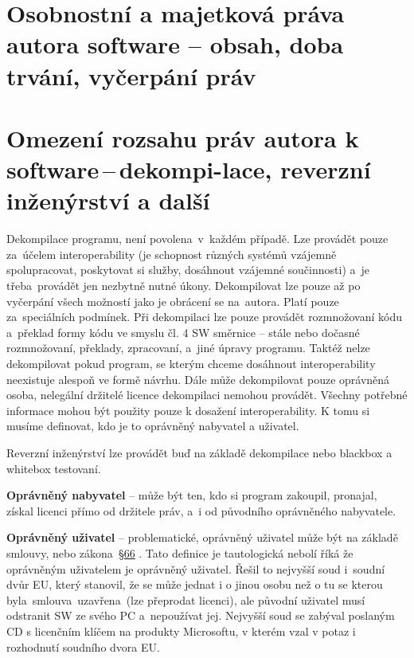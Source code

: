 \newpage
\section{Osobnostní a majetková práva autora software -- obsah, doba trvání, vyčerpání práv}














\newpage
\section[Omezení rozsahu práv autora k software\,--\,dekompilace, reverzní inženýrství a další]{Omezení rozsahu práv autora k software\,--\,dekompi-lace, reverzní inženýrství a další}

Dekompilace programu, není povolena~v~každém případě. Lze provádět pouze za~účelem interoperability (je schopnost různých systémů vzájemně spolupracovat, poskytovat si služby, dosáhnout vzájemné součinnosti) a~je třeba~provádět jen nezbytně nutné úkony. Dekompilovat lze pouze až po vyčerpání všech možností jako je obrácení se na~autora. Platí pouze za~speciálních podmínek. Při dekompilaci lze pouze provádět rozmnožovaní kódu a~překlad formy kódu ve smyslu čl. 4 SW směrnice -- stále nebo dočasné rozmnožovaní, překlady, zpracovaní, a~jiné úpravy programu. Taktéž nelze dekompilovat pokud program, se kterým chceme dosáhnout interoperability neexistuje alespoň ve formě návrhu. Dále může dekompilovat pouze oprávněná osoba, nelegální držitelé licence dekompilaci nemohou provádět. Všechny potřebné informace mohou být použity pouze k dosažení interoperability. K tomu si musíme definovat, kdo je to oprávněný nabyvatel a uživatel.

Reverzní inženýrství lze provádět buď na základě dekompilace nebo blackbox a whitebox testovaní. 

\textbf{Oprávněný nabyvatel} -- může být ten, kdo si program zakoupil, pronajal, získal licenci přímo od držitele práv, a~i od původního oprávněného nabyvatele.

\textbf{Oprávněný uživatel} -- problematické, oprávněný uživatel může být na základě smlouvy, nebo zákona~\href{https://www.zakonyprolidi.cz/cs/2000-121#p66-6}{§66} . Tato definice je tautologická nebolí říká že oprávněným uživatelem je oprávněný uživatel. Řešil to nejvyšší soud i~soudní dvůr EU, který stanovil, že se může jednat i o jinou osobu než o tu se kterou byla~smlouva~uzavřena~(lze přeprodat licenci), ale původní uživatel musí odstranit SW ze svého PC a~nepoužívat jej. Nejvyšší soud se zabýval poslaným CD s licenčním klíčem na produkty Microsoftu, v kterém vzal v potaz i rozhodnutí soudního dvora EU.

